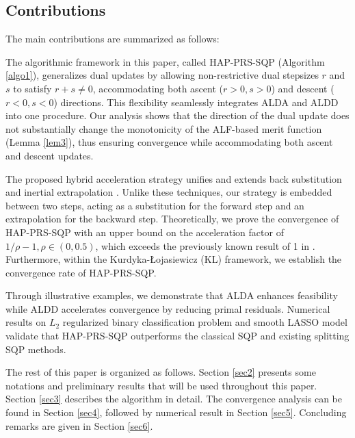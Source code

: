 \documentclass[pdflatex,sn-mathphys-num]{sn-jnl}%
\theoremstyle{thmstyleone}%
\theoremstyle{thmstyletwo}%
\theoremstyle{thmstylethree}%
\begin{document}
\subsection{Contributions}
The main contributions are summarized as follows:

The algorithmic framework in this paper, called HAP-PRS-SQP (Algorithm \ref{algo1}), generalizes dual updates by allowing non-restrictive dual stepsizes $r$ and $s$ to satisfy $r+s\ne 0$, accommodating both ascent ($r>0,s>0$) and descent ($r<0,s<0$) directions. This flexibility seamlessly integrates ALDA and ALDD into one procedure.
Our analysis shows that the direction of the dual update does not substantially change the monotonicity of the ALF-based merit function (Lemma \ref{lem3}), thus ensuring convergence while accommodating both ascent and descent updates.

The proposed hybrid acceleration strategy unifies and extends back substitution \cite{HTY12} and inertial extrapolation \cite{AA01}. Unlike these techniques, our strategy is embedded between two steps, acting as a substitution for the forward step and an extrapolation for the backward step. 
Theoretically, we prove the convergence of HAP-PRS-SQP with an upper bound on the acceleration factor of $1/\rho-1,\rho\in (0,0.5)$, which exceeds the previously known result of 1 in \cite{DLL17}. Furthermore, within the Kurdyka-{\L}ojasiewicz (KL) framework, we establish the convergence rate of HAP-PRS-SQP.

Through illustrative examples, we demonstrate that ALDA enhances feasibility while ALDD accelerates convergence by reducing primal residuals. Numerical results on  $L_2$ regularized binary classification problem and smooth LASSO model validate that HAP-PRS-SQP outperforms the classical SQP and existing splitting SQP methods.

The rest of this paper is organized as follows. Section \ref{sec2} presents some notations and preliminary results that will be used throughout this paper. Section \ref{sec3} describes the algorithm in detail. The convergence analysis can be found in Section \ref{sec4}, followed by numerical result in Section \ref{sec5}. Concluding remarks are given in Section \ref{sec6}.
\end{document}
